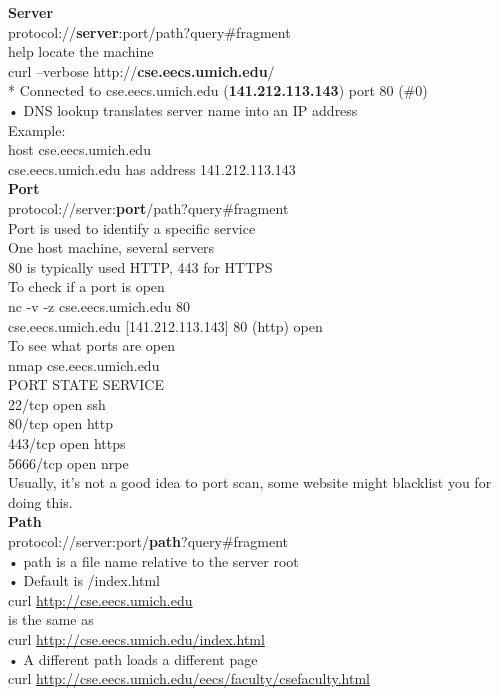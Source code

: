 \documentclass{article}
\begin{document}
\textbf{Server}\\
protocol://\textbf{server}:port/path?query#fragment\\
help locate the machine\\
 curl --verbose http://\textbf{cse.eecs.umich.edu}/ \\
* Connected to cse.eecs.umich.edu (\textbf{141.212.113.143}) port 80 (\#0)\\
• DNS lookup translates server name into an IP address \\
Example: \\
host cse.eecs.umich.edu\\
cse.eecs.umich.edu has address 141.212.113.143 \\
\textbf{Port}\\
protocol://server:\textbf{port}/path?query#fragment\\
Port is used to identify a specific service\\
One host machine, several servers\\
80 is typically used HTTP, 443 for HTTPS\\
To check if a port is open\\
nc -v -z cse.eecs.umich.edu 80 \\
cse.eecs.umich.edu [141.212.113.143] 80 (http) open\\
To see what ports are open\\
nmap cse.eecs.umich.edu\\
PORT STATE SERVICE \\
22/tcp open ssh \\
80/tcp open http \\
443/tcp open https\\
5666/tcp open nrpe \\
Usually, it's not a good idea to port scan, some website might blacklist you for doing this.\\
\textbf{Path}\\
protocol://server:port/\textbf{path}?query#fragment\\
• path is a file name relative to the server root \\
• Default is /index.html \\
curl \url{http://cse.eecs.umich.edu} \\
is the same as\\
curl \url{http://cse.eecs.umich.edu/index.html}\\
• A different path loads a different page\\
curl \url{http://cse.eecs.umich.edu/eecs/faculty/csefaculty.html}\\
\end{document}
